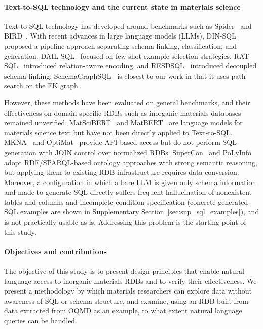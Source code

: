 \paragraph*{Text-to-SQL technology and the current state in materials science}

Text-to-SQL technology has developed around benchmarks such as Spider~\cite{yu2018spider} and BIRD~\cite{li2024bird}. With recent advances in large language models (LLMs), DIN-SQL~\cite{pourreza2024dinsql} proposed a pipeline approach separating schema linking, classification, and generation. DAIL-SQL~\cite{gao2023dail} focused on few-shot example selection strategies. RAT-SQL~\cite{wang2020ratsql} introduced relation-aware encoding, and RESDSQL~\cite{li2023resdsql} introduced decoupled schema linking. SchemaGraphSQL~\cite{safdarian2026schemagraphsql} is closest to our work in that it uses path search on the FK graph.

However, these methods have been evaluated on general benchmarks, and their effectiveness on domain-specific RDBs such as inorganic materials databases remained unverified. MatSciBERT~\cite{gupta2022matscibert} and MatBERT~\cite{walker2021matbert} are language models for materials science text but have not been directly applied to Text-to-SQL. MKNA~\cite{zhuang2026mkna} and OptiMat~\cite{hu2026optimat} provide API-based access but do not perform SQL generation with JOIN control over normalized RDBs. SuperCon~\cite{ishii2023supercon} and PoLyInfo~\cite{ishii2024polyinfo} adopt RDF/SPARQL-based ontology approaches with strong semantic reasoning, but applying them to existing RDB infrastructure requires data conversion. Moreover, a configuration in which a bare LLM is given only schema information and made to generate SQL directly suffers frequent hallucination of nonexistent tables and columns and incomplete condition specification (concrete generated-SQL examples are shown in Supplementary Section~\ref{sec:sup_sql_examples}), and is not practically usable as is. Addressing this problem is the starting point of this study.

\paragraph*{Objectives and contributions}

The objective of this study is to present design principles that enable natural language access to inorganic materials RDBs and to verify their effectiveness. We present a methodology by which materials researchers can explore data without awareness of SQL or schema structure, and examine, using an RDB built from data extracted from OQMD as an example, to what extent natural language queries can be handled.

